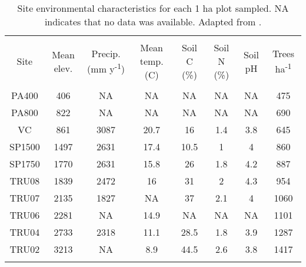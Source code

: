 
\begin{table}[!htbp] \centering 
  \caption{Site environmental characteristics for each 1 ha plot sampled. NA indicates that no data was available. Adapted from \citet{Whitaker2014}.} 
  \label{site_char} 
\begin{tabular}{@{\extracolsep{0pt}} cccccccc} 
\\[-1.8ex]\hline 
\hline \\[-1.8ex] 
{Site} & {Mean elev.} & {Precip. (mm y\textsuperscript{-1})} & { Mean temp. (\textdegree{}C)} & {Soil C (\%)} & {Soil N (\%)} & {Soil pH} & {Trees ha\textsuperscript{-1}} \\
\hline \\[-1.8ex] 
PA400 & 406 & NA & NA & NA & NA & NA & 475 \\ 
PA800 & 822 & NA & NA & NA & NA & NA & 690 \\ 
VC & 861 & 3087 & 20.7 & 16 & 1.4 & 3.8 & 645 \\ 
SP1500 & 1497 & 2631 & 17.4 & 10.5 & 1 & 4 & 860 \\ 
SP1750 & 1770 & 2631 & 15.8 & 26 & 1.8 & 4.2 & 887 \\ 
TRU08 & 1839 & 2472 & 16 & 31 & 2 & 4.3 & 954 \\ 
TRU07 & 2135 & 1827 & NA & 37 & 2.1 & 4 & 1060 \\ 
TRU06 & 2281 & NA & 14.9 & NA & NA & NA & 1101 \\ 
TRU04 & 2733 & 2318 & 11.1 & 28.5 & 1.8 & 3.9 & 1287 \\ 
TRU02 & 3213 & NA & 8.9 & 44.5 & 2.6 & 3.8 & 1417 \\ 
\hline \\[-1.8ex] 
\end{tabular} 
\end{table} 
